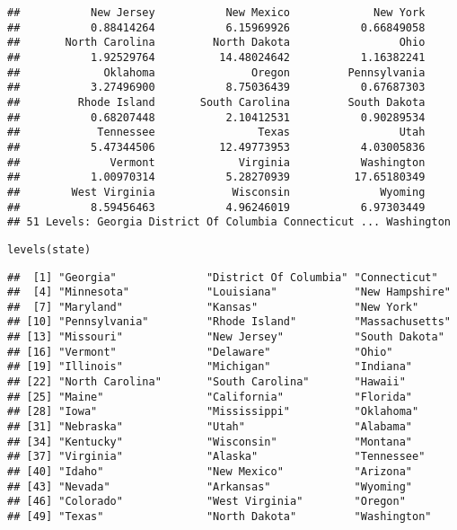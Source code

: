 \documentclass[]{article}
\begin{document}
\begin{verbatim}
##           New Jersey           New Mexico             New York 
##           0.88414264           6.15969926           0.66849058 
##       North Carolina         North Dakota                 Ohio 
##           1.92529764          14.48024642           1.16382241 
##             Oklahoma               Oregon         Pennsylvania 
##           3.27496900           8.75036439           0.67687303 
##         Rhode Island       South Carolina         South Dakota 
##           0.68207448           2.10412531           0.90289534 
##            Tennessee                Texas                 Utah 
##           5.47344506          12.49773953           4.03005836 
##              Vermont             Virginia           Washington 
##           1.00970314           5.28270939          17.65180349 
##        West Virginia            Wisconsin              Wyoming 
##           8.59456463           4.96246019           6.97303449 
## 51 Levels: Georgia District Of Columbia Connecticut ... Washington
\end{verbatim}

\begin{verbatim}
levels(state)
\end{verbatim}

\begin{verbatim}
##  [1] "Georgia"              "District Of Columbia" "Connecticut"         
##  [4] "Minnesota"            "Louisiana"            "New Hampshire"       
##  [7] "Maryland"             "Kansas"               "New York"            
## [10] "Pennsylvania"         "Rhode Island"         "Massachusetts"       
## [13] "Missouri"             "New Jersey"           "South Dakota"        
## [16] "Vermont"              "Delaware"             "Ohio"                
## [19] "Illinois"             "Michigan"             "Indiana"             
## [22] "North Carolina"       "South Carolina"       "Hawaii"              
## [25] "Maine"                "California"           "Florida"             
## [28] "Iowa"                 "Mississippi"          "Oklahoma"            
## [31] "Nebraska"             "Utah"                 "Alabama"             
## [34] "Kentucky"             "Wisconsin"            "Montana"             
## [37] "Virginia"             "Alaska"               "Tennessee"           
## [40] "Idaho"                "New Mexico"           "Arizona"             
## [43] "Nevada"               "Arkansas"             "Wyoming"             
## [46] "Colorado"             "West Virginia"        "Oregon"              
## [49] "Texas"                "North Dakota"         "Washington"
\end{verbatim}
\end{document}
